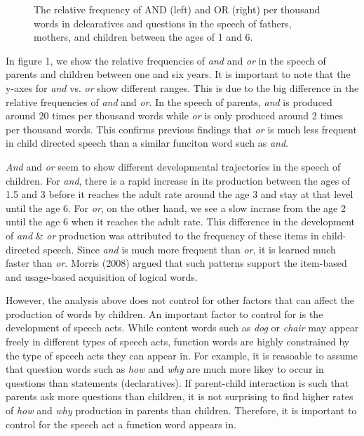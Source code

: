 \documentclass[10pt, letterpaper]{article}
\newenvironment{CodeChunk}{}{}
\begin{document}
\begin{CodeChunk}
\begin{figure}[t]
{}

\caption[The relative frequency of AND (left) and OR (right) per thousand words in delcaratives and questions in the speech of fathers, mothers, and children between the ages of 1 and 6]{The relative frequency of AND (left) and OR (right) per thousand words in delcaratives and questions in the speech of fathers, mothers, and children between the ages of 1 and 6.}\label{fig:byspeechActPlots}
\end{figure}
\end{CodeChunk}

In figure 1, we show the relative frequencies of \emph{and} and
\emph{or} in the speech of parents and children between one and six
years. It is important to note that the y-axes for \emph{and} vs.
\emph{or} show different ranges. This is due to the big difference in
the relative frequencies of \emph{and} and \emph{or}. In the speech of
parents, \emph{and} is produced around 20 times per thousand words while
\emph{or} is only produced around 2 times per thousand words. This
confirms previous findings that \emph{or} is much less frequent in child
directed speech than a similar funciton word such as \emph{and}.

\emph{And} and \emph{or} seem to show different developmental
trajectories in the speech of children. For \emph{and}, there is a rapid
increase in its production between the ages of 1.5 and 3 before it
reaches the adult rate around the age 3 and stay at that level until the
age 6. For \emph{or}, on the other hand, we see a slow incrase from the
age 2 until the age 6 when it reaches the adult rate. This difference in
the development of \emph{and} \& \emph{or} production was attributed to
the frequency of these items in child-directed speech. Since \emph{and}
is much more frequent than \emph{or}, it is learned much faster than
\emph{or}. Morris (2008) argued that such patterns support the
item-based and usage-based acquisition of logical words.

However, the analysis above does not control for other factors that can
affect the production of words by children. An important factor to
control for is the development of speech acts. While content words such
as \emph{dog} or \emph{chair} may appear freely in different types of
speech acts, function words are highly constrained by the type of speech
acts they can appear in. For example, it is reasoable to assume that
question words such as \emph{how} and \emph{why} are much more likey to
occur in questions than statements (declaratives). If parent-child
interaction is such that parents ask more questions than children, it is
not surprising to find higher rates of \emph{how} and \emph{why}
production in parents than children. Therefore, it is important to
control for the speech act a function word appears in.
\end{document}
